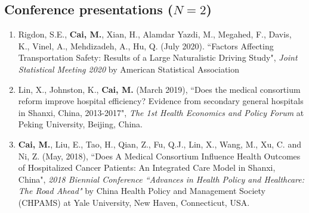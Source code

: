 \documentclass[11pt, a4paper]{article}
\newcommand{\years}[1]{\marginnote{\scriptsize #1}}
\begin{document}
	\subsection*{Conference presentations ($N=2$)}
	\begin{enumerate}[leftmargin=0ex,itemsep=1ex]
		\item \years{2020}Rigdon, S.E., \textbf{Cai, M.}, Xian, H., Alamdar Yazdi, M., Megahed, F., Davis, K., Vinel, A., Mehdizadeh, A., Hu, Q. (July 2020). ``Factors Affecting Transportation Safety: Results of a Large Naturalistic Driving Study", \emph{Joint Statistical Meeting 2020} by American Statistical Association
		
		\item \years{2019}Lin, X., Johnston, K., \textbf{Cai, M.} (March 2019), ``Does the medical consortium reform improve hospital efficiency? Evidence from secondary general hospitals in Shanxi, China, 2013-2017", \emph{The 1st Health Economics and Policy Forum} at Peking University, Beijing, China.
		
		\item \years{2018}\textbf{Cai, M.}, Liu, E., Tao, H., Qian, Z., Fu, Q.J., Lin, X., Wang, M., Xu, C. and Ni, Z. (May, 2018), ``Does A Medical Consortium Influence Health Outcomes of Hospitalized Cancer Patients: An Integrated Care Model in Shanxi, China", \emph{2018 Biennial Conference ``Advances in Health Policy and Healthcare: The Road Ahead"} by China Health Policy and Management Society (CHPAMS) at Yale University, New Haven, Connecticut, USA.
	\end{enumerate}
	
\end{document}
